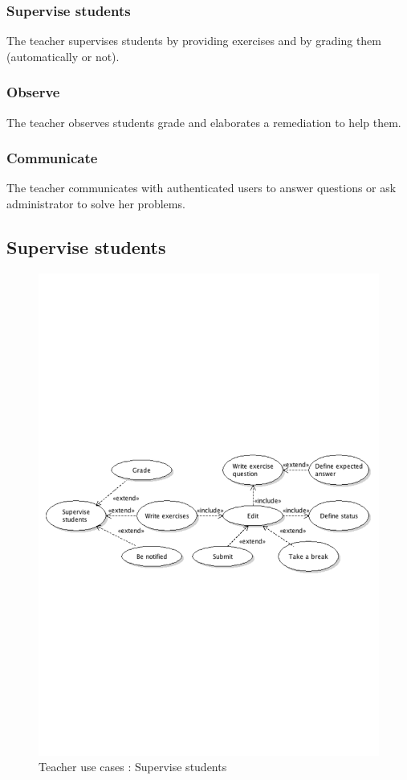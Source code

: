 		\subsubsection{Supervise students}
			The teacher supervises students by providing exercises and by grading them (automatically or not).
		\subsubsection{Observe}
			The teacher observes students grade and elaborates a remediation to help them.
		\subsubsection{Communicate}
			The teacher communicates with authenticated users to answer questions or ask administrator to solve her problems.
\newpage
	\subsection{Supervise students}
		\begin{figure}[ht]
			\begin{center}
				\includegraphics[width=\textwidth,  trim=2cm 10cm 2cm 10cm]{UML_figure/use_cases/teacher/UC_Teacher_Supervise.pdf}
				\caption{Teacher use cases : Supervise students}
			\end{center}
		\end{figure}
